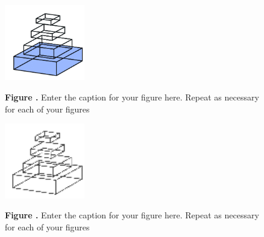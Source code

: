 \documentclass{frontiersSCNS} %
\begin{document}
\begin{figure}
\begin{center}
\includegraphics[width=3.5cm]{logo1}%
\end{center}
 \textbf{\label{fig:01} Figure .}{ Enter the caption for your figure here.  Repeat as  necessary for each of your figures }
\end{figure}

\begin{figure}
\begin{center}
\includegraphics[width=3.5cm]{logo2}%
\end{center}
 \textbf{\label{fig:02} Figure .}{ Enter the caption for your figure here.  Repeat as  necessary for each of your figures }
\end{figure}

%




\end{document}
